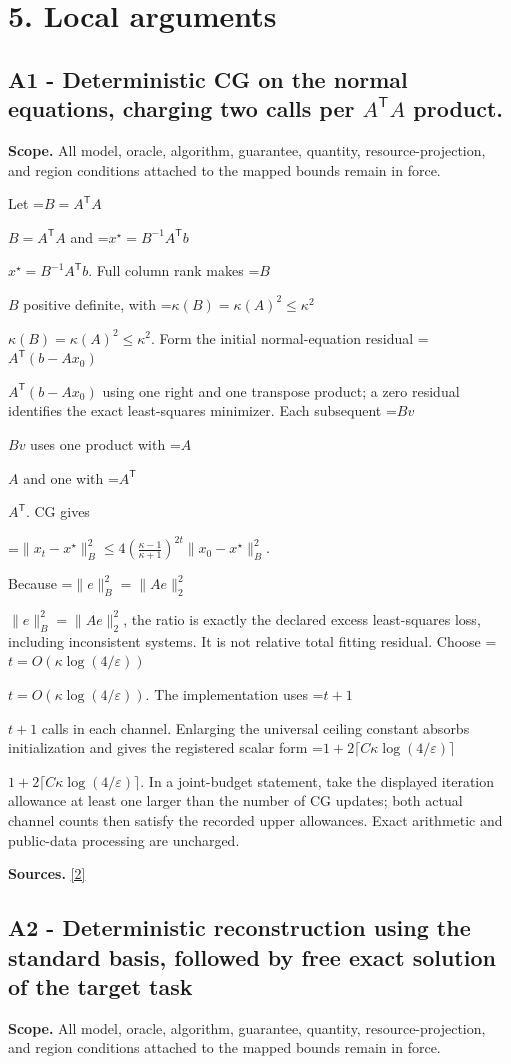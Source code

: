 \documentclass[10pt,a4paper]{article}
\newcommand{\AtlasMath}[1]{\par\begingroup\centering\setbox0=\hbox{$\displaystyle #1$}\ifdim\wd0>1.4\linewidth\typeout{ATLAS WIDE FORMULA: \the\wd0}\fi\ifdim\wd0>\linewidth\resizebox{\linewidth}{!}{\box0}\else\box0\fi\par\endgroup}
\newcommand{\AtlasInlineMath}[1]{\begingroup\setbox0=\hbox{$#1$}\ifdim\wd0>.4\linewidth\endgroup\AtlasMath{#1}\else\endgroup$#1$\fi}
\begin{document}
\section{5. Local arguments}
\subsection{A1 - Deterministic CG on the normal equations, charging two calls per $A^{\mathsf T}A$ product.}
\textbf{Scope.} All model, oracle, algorithm, guarantee, quantity, resource-projection, and region conditions attached to the mapped bounds remain in force.

Let \AtlasInlineMath{B=A^{\mathsf T}A} and \AtlasInlineMath{x^\star=B^{-1}A^{\mathsf T}b}. Full column rank makes \AtlasInlineMath{B} positive definite, with \AtlasInlineMath{\kappa(B)=\kappa(A)^2\le\kappa^2}. Form the initial normal-equation residual \AtlasInlineMath{A^{\mathsf T}(b-Ax_0)} using one right and one transpose product; a zero residual identifies the exact least-squares minimizer. Each subsequent \AtlasInlineMath{Bv} uses one product with \AtlasInlineMath{A} and one with \AtlasInlineMath{A^{\mathsf T}}.
CG gives

\AtlasMath{\|x_t-x^\star\|_B^2\le4\left(\frac{\kappa-1}{\kappa+1}\right)^{2t}\|x_0-x^\star\|_B^2.}

Because \AtlasInlineMath{\|e\|_B^2=\|Ae\|_2^2}, the ratio is exactly the declared excess least-squares loss, including inconsistent systems. It is not relative total fitting residual. Choose \AtlasInlineMath{t=O(\kappa\log(4/\varepsilon))}. The implementation uses \AtlasInlineMath{t+1} calls in each channel. Enlarging the universal ceiling constant absorbs initialization and gives the registered scalar form \AtlasInlineMath{1+2\lceil C\kappa\log(4/\varepsilon)\rceil}. In a joint-budget statement, take the displayed iteration allowance at least one larger than the number of CG updates; both actual channel counts then satisfy the recorded upper allowances. Exact arithmetic and public-data processing are uncharged.

\textbf{Sources.} \href{https://arxiv.org/pdf/1708.07788v2}{[2]}

\subsection{A2 - Deterministic reconstruction using the standard basis, followed by free exact solution of the target task}
\textbf{Scope.} All model, oracle, algorithm, guarantee, quantity, resource-projection, and region conditions attached to the mapped bounds remain in force.
\end{document}
